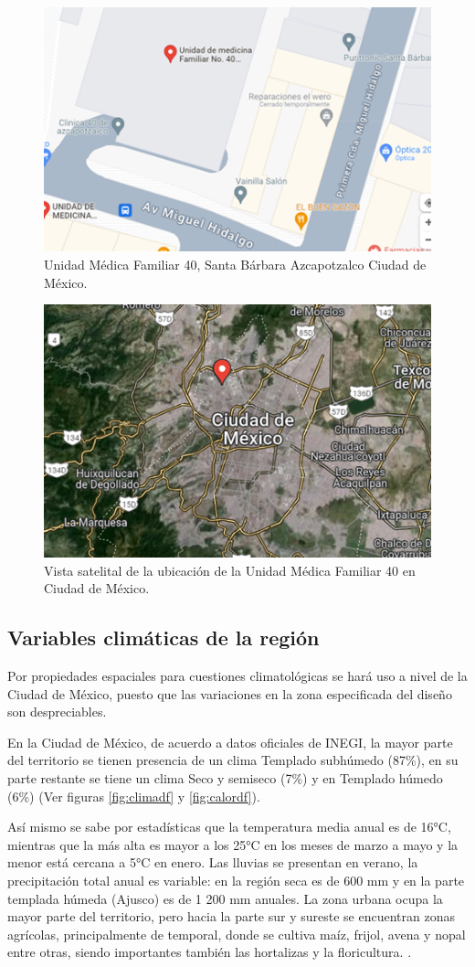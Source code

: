 \begin{figure}[H]
	\centering
	\includegraphics[width=0.6\linewidth]{figures/mapsumf40}
	\caption{Unidad Médica Familiar 40, Santa Bárbara Azcapotzalco Ciudad de México.}
	\label{fig:mapsumf40}
\end{figure}

\begin{figure}[H]
	\centering
	\includegraphics[width=0.6\linewidth]{figures/sateliteumf41}
	\caption{Vista satelital de la ubicación de la Unidad Médica Familiar 40 en Ciudad de México.}
	\label{fig:sateliteumf41}
\end{figure}

\subsection{Variables climáticas de la región}

Por propiedades espaciales para cuestiones climatológicas se hará uso a nivel de la Ciudad de México, puesto que las variaciones en la zona especificada del diseño son despreciables. 

En la Ciudad de México, de acuerdo a datos oficiales de INEGI, la mayor parte del territorio se tienen presencia de un clima Templado subhúmedo (87\%), en su parte restante se tiene un clima Seco y semiseco (7\%) y en Templado húmedo (6\%) (Ver figuras \ref{fig:climadf} y \ref{fig:calordf}).

Así mismo se sabe por estadísticas que la temperatura media anual es de 16°C, mientras que la más alta es mayor a los 25°C en los meses de marzo a mayo  y la menor está cercana a 5°C en enero. Las lluvias se presentan en verano, la precipitación total anual es variable: en la región seca es de 600 mm y en la parte templada húmeda (Ajusco) es de 1 200 mm anuales.
La zona urbana ocupa la mayor parte del territorio, pero hacia la parte sur y sureste se encuentran zonas agrícolas, principalmente de temporal, donde se cultiva maíz, frijol, avena y nopal entre otras, siendo importantes también las hortalizas y la floricultura. \cite{clima-df}.


